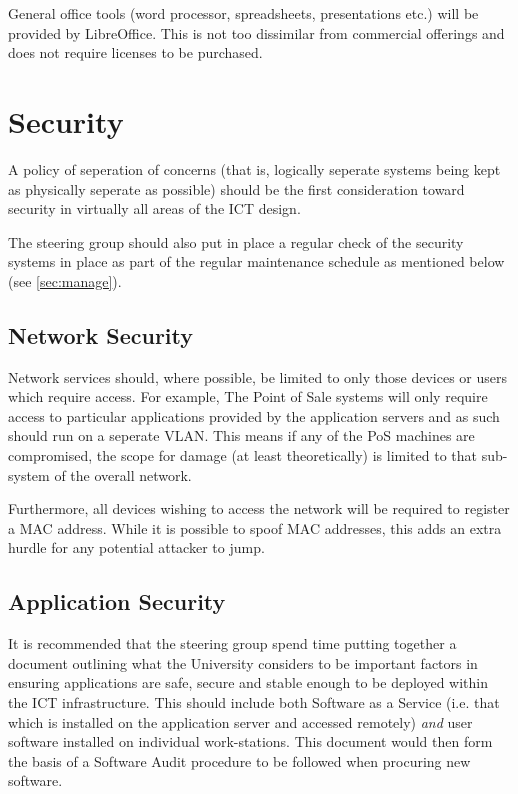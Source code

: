 \documentclass[a4paper, twoside]{article}
\begin{document}
General office tools (word processor, spreadsheets, presentations etc.) will be
provided by LibreOffice. This is not too dissimilar from commercial offerings
and does not require licenses to be purchased.

\section{Security}
\label{sec:security}
A policy of seperation of concerns (that is, logically seperate systems being
kept as physically seperate as possible) should be the first consideration
toward security in virtually all areas of the ICT design.

The steering group should also put in place a regular check of the security
systems in place as part of the regular maintenance schedule as mentioned below
(see \ref{sec:manage}).

\subsection{Network Security}
Network services should, where possible, be limited to only those devices or
users which require access. For example, The Point of Sale systems will only
require access to particular applications provided by the application servers
and as such should run on a seperate VLAN. This means if any of the PoS
machines are compromised, the scope for damage (at least theoretically) is
limited to that sub-system of the overall network.

Furthermore, all devices wishing to access the network will be required to
register a MAC address. While it is possible to spoof MAC addresses, this adds
an extra hurdle for any potential attacker to jump.

\subsection{Application Security}
It is recommended that the steering group spend time putting together a document
outlining what the University considers to be important factors in ensuring
applications are safe, secure and stable enough to be deployed within the ICT
infrastructure. This should include both Software as a Service (i.e. that which
is installed on the application server and accessed remotely) \emph{and} user
software installed on individual work-stations. This document would then form
the basis of a Software Audit procedure to be followed when procuring new
software.
\end{document}
